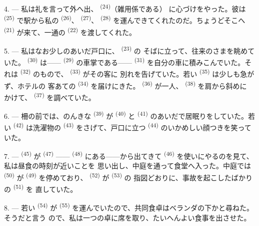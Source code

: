 4. --- 私は礼を言って外へ出、 \textsuperscript{(24)}（雑用係である）
に心づけをやった。彼は \textsuperscript{(25)} で駅から私の
 \textsuperscript{(26)}、 \textsuperscript{(27)}、
 \textsuperscript{(28)} を運んできてくれたのだ。ちょうどそこへ
 \textsuperscript{(21)} が来て、一通の
\textsuperscript{(22)} を渡してくれた。

5. --- 私はなお少しのあいだ戸口に、 \textsuperscript{(23)} の
そばに立って、往来のさまを眺めていた。 \textsuperscript{(30)} は——
 \textsuperscript{(29)} の車掌である——
\textsuperscript{(31)} を自分の車に積みこんでいた。それは
\textsuperscript{(32)} のもので、 \textsuperscript{(33)} がその客に
別れを告げていた。若い \textsuperscript{(35)} は少しも急がず、ホテルの
客あての \textsuperscript{(34)} を届けにきた。
\textsuperscript{(36)} が一人、 \textsuperscript{(38)} を肩から斜めに
かけて、 \textsuperscript{(37)} を調べていた。

\VUsaut{4.0mm}
\VUsaut{3.0mm}

6. --- 柵の前では、のんきな \textsuperscript{(39)} が
 \textsuperscript{(40)} と \textsuperscript{(41)}
のあいだで居眠りをしていた。若い \textsuperscript{(42)} は洗濯物の
 \textsuperscript{(43)} をさげて、戸口に立つ
\textsuperscript{(44)} のいかめしい顔つきを笑っていた。

7. ---  \textsuperscript{(45)} が
\textsuperscript{(47)} —— \textsuperscript{(48)} にある——から出てきて
 \textsuperscript{(46)} を使いにやるのを見て、私は昼食の時刻が近いことを
思い出し、中庭を通って食堂へ入った。中庭では
\textsuperscript{(50)} が \textsuperscript{(49)} を停めており、
 \textsuperscript{(52)} が \textsuperscript{(53)} の
指図どおりに、事故を起こしたばかりの \textsuperscript{(51)} を
直していた。

8. --- 若い \textsuperscript{(54)} が
\textsuperscript{(55)} を運んでいたので、共同食卓はベランダの下かと尋ねた。そうだと言う
ので、私は一つの卓に席を取り、たいへんよい食事を出させた。

